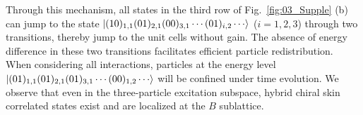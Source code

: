 \documentclass[longbibliography, aps, prx, amsmath, amssymb, amsfonts, twocolumn,superscriptaddress, footinbib]{revtex4-1}
\begin{document}
	Through this mechanism, all states in the third row of Fig.~\ref{fig:03_Supple} (b) can jump to the state 
	$\ket{(10)_{1,1}(01)_{2,1}(00)_{3,1}\cdots(01)_{i,2}\cdots}$ ($i=1,2,3$) 
	through two transitions, thereby jump to the unit cells without gain. 
	The absence of energy difference in these two transitions facilitates efficient particle redistribution.
	When considering all interactions, particles at the energy level $\ket{(01)_{1,1}(01)_{2,1}(01)_{3,1}\cdots(00)_{1,2}\cdots}$ will be confined under time evolution.
	We observe that even in the three-particle excitation subspace, hybrid chiral skin correlated states exist and are localized at the $B$ sublattice. 

	
\end{document}
